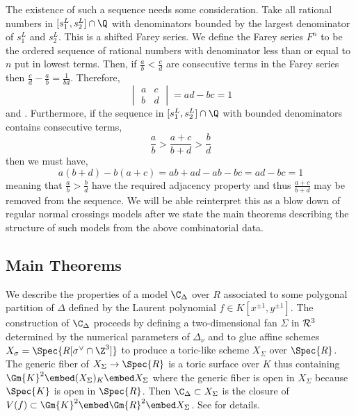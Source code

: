 \begin{rmk}
The existence of such a sequence needs some consideration. Take all rational numbers in $[s_1^L, s_2^L] \cap \Q$ with denominators bounded by the largest denominator of $s_1^L$ and $s_2^L$. This is a shifted Farey series. We define the Farey series $F^n$ to be the ordered sequence of rational numbers with denominator less than or equal to $n$ put in lowest terms. Then, if $\frac{a}{b} < \frac{c}{d}$ are consecutive terms in the Farey series then $\frac{c}{d} - \frac{a}{b} = \frac{1}{bd}$. Therefore,
\[ \begin{vmatrix}
a & c 
\\
b & d 
\end{vmatrix}
= ad - bc = 1 \] 
\cite[Remark 3.15]{tim} and \cite[Ch. III, Thm. 28, Thm. 29]{HW}.
Furthermore, if the sequence in $[s_1^L, s_2^L] \cap \Q$ with bounded denominators contains consecutive terms,
\[ \frac{a}{b} > \frac{a + c}{b + d} > \frac{b}{d} \]
then we must have,
\[ a(b + d) - b(a + c) = ab + ad - ab - bc = ad - bc = 1 \]
meaning that $\frac{a}{b} > \frac{b}{d}$ have the required adjacency property and thus $\frac{a + c}{b + d}$ may be removed from the sequence. We will be able reinterpret this as a blow down of regular normal crossings models after we state the main theorems describing the structure of such models from the above combinatorial data.
\end{rmk}

\subsection{Main Theorems}

We describe the properties of a model $\C_\Delta$ over $R$ associated to some polygonal partition of $\Delta$ defined by the Laurent polynomial $f \in K[x^{\pm 1}, y^{\pm 1}]$. The construction of $\C_\Delta$ proceeds by defining a two-dimensional fan $\Sigma$ in $\mathcal{R}^3$ determined by the numerical parameters of $\Delta_\nu$ and to glue affine schemes $X_\sigma = \Spec{R[\sigma^\vee \cap \Z^3]}$ to produce a toric-like scheme $X_\Sigma$ over $\Spec{R}$. The generic fiber of $X_\Sigma \to \Spec{R}$ is a toric surface over $K$ thus containing $\Gm{K}^2 \embed (X_\Sigma)_K \embed X_\Sigma$ where the generic fiber is open in $X_\Sigma$ because $\Spec{K}$ is open in $\Spec{R}$. Then $\C_\Delta \subset X_\Sigma$ is the closure of $V(f) \subset \Gm{K}^2 \embed \Gm{R}^2 \embed X_\Sigma$. See \cite[Section 4]{tim} for details.


